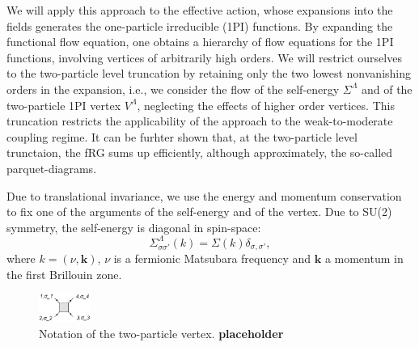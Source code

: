 We will apply this approach to the effective action, whose expansions into the fields generates the one-particle irreducible (1PI)  functions. By expanding the functional flow equation, one obtains a hierarchy of flow equations for the 1PI functions, involving vertices of arbitrarily  high orders. 
We will restrict ourselves to the two-particle level truncation by retaining only the two lowest nonvanishing orders in the expansion, i.e., we consider the flow of the self-energy $\Sigma^\Lambda$ and of the two-particle 1PI vertex $V^\Lambda$, neglecting the effects of higher order vertices. 
This truncation restricts the applicability of the approach to the weak-to-moderate coupling regime\cite{Salmhofer2001}. 
It can be furhter shown that, at the two-particle level trunctaion, the fRG sums up efficiently, although approximately, the so-called parquet-diagrams\cite{Binz2002,Binz2003,Kugler2017}. 

Due to translational invariance, we use the energy and momentum conservation to fix one of the arguments of the self-energy and of the vertex.  
Due to SU(2) symmetry, the self-energy is diagonal in spin-space: 
\begin{equation}
\Sigma^\Lambda_{\sigma\sigma'}(k)=\Sigma(k)\delta_{\sigma,\sigma'}, 
\end{equation}
where $k=(\nu,\mathbf{k})$, $\nu$ is a fermionic Matsubara frequency and $\mathbf{k}$ a momentum in the first Brillouin zone. 
\begin{figure}
\includegraphics[width=0.15\textwidth]{images/VertexBox.png}
\caption{Notation of the two-particle vertex. \textbf{placeholder}
} 
\label{fig:notvert} 
\end{figure}

